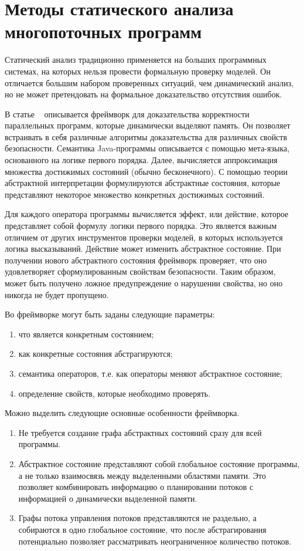 
\section{Методы статического анализа многопоточных программ}
\label{rw:static}
Статический анализ традиционно применяется на больших программных системах, на которых нельзя провести формальную проверку моделей. Он отличается большим набором проверенных ситуаций, чем динамический анализ, но не может претендовать на формальное доказательство отсутствия ошибок.

В статье ~\cite{Yahav:2008} описывается фреймворк для доказательства корректности параллельных программ, которые динамически выделяют память.
Он позволяет встраивать в себя различные алгоритмы доказательства для различных свойств безопасности.
Семантика Java-программы описывается с помощью мета-языка, основанного на логике первого порядка.
Далее, вычисляется аппроксимация множества достижимых состояний (обычно бесконечного).
С помощью теории абстрактной интерпретации формулируются абстрактные состояния, которые представляют некоторое множество конкретных достижимых состояний.

Для каждого оператора программы вычисляется эффект, или действие, которое представляет собой формулу логики первого порядка.
Это является важным отличием от других инструментов проверки моделей, в которых используется логика высказываний.
Действие может изменить абстрактное состояние. При получении нового абстрактного состояния фреймворк проверяет, что оно удовлетворяет сформулированным свойствам безопасности. 
Таким образом, может быть получено ложное предупреждение о нарушении свойства, но оно никогда не будет пропущено.

Во фреймворке могут быть заданы следующие параметры:
\begin{enumerate}
\item что является конкретным состоянием;
\item как конкретные состояния абстрагируются;
\item семантика операторов, т.е. как операторы меняют абстрактное состояние;
\item определение свойств, которые необходимо проверять.
\end{enumerate}

Можно выделить следующие основные особенности фреймворка.
\begin{enumerate}
\item Не требуется создание графа абстрактных состояний сразу для всей программы.
\item Абстрактное состояние представляют собой глобальное состояние программы, а не только взаимосвязь между выделенными областями памяти. Это позволяет комбинировать информацию о планировании потоков с информацией о динамически выделенной памяти.
\item Графы потока управления потоков представляются не раздельно, а собираются в одно глобальное состояние, что после абстрагирования потенциально позволяет рассматривать неограниченное количество потоков.
\end{enumerate}

